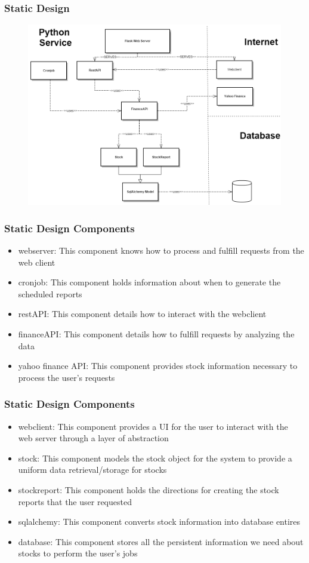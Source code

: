 \documentclass{beamer}
\begin{document}
\begin{frame}
\frametitle{Static Design}
\begin{figure}[h!]
  \centering
  \includegraphics[scale=0.3]{stock_uml.png}
\end{figure}
\end{frame}

\begin{frame}
\frametitle{Static Design Components}
\begin{itemize}
\item webserver: This component knows how to process and fulfill requests from the web client 
\item cronjob: This component holds information about when to generate the scheduled reports
\item restAPI: This component details how to interact with the webclient
\item financeAPI: This component details how to fulfill requests by analyzing the data
\item yahoo finance API: This component provides stock information necessary to process the user's requests
\end{itemize}
\end{frame}


\begin{frame}
\frametitle{Static Design Components}
\begin{itemize}
\item webclient: This component provides a UI for the user to interact with the web server through a layer of abstraction
\item stock: This component models the stock object for the system to provide a uniform data retrieval/storage for stocks
\item stockreport: This component holds the directions for creating the stock reports that the user requested
\item sqlalchemy: This component converts stock information into database entires
\item database: This component stores all the persistent information we need about stocks to perform the user's jobs
\end{itemize}
\end{frame}
\end{document}
